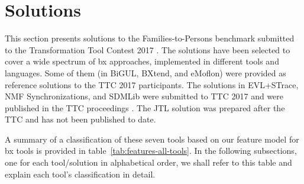 \section{Solutions}
\label{sec:Solutions}



This section presents solutions to the Families-to-Persons benchmark submitted to the Transformation Tool Contest 2017 \cite{Anjorin2017a}. The solutions have been selected to cover a wide spectrum of bx approaches, implemented in different tools and languages. Some of them (in BiGUL, BXtend, and eMoflon) were provided as reference solutions to the TTC 2017 participants. The solutions in EVL+STrace, NMF Synchronizations, and SDMLib were submitted to TTC 2017 and were published in the TTC proceedings \cite{Samimi-Dehkordi2017,Hinkel2017,Zundorf2017}. The JTL solution was prepared after the TTC and has not been published to date. 

A summary of a classification of these seven tools based on our feature model for bx tools is provided in table~\ref{tab:features-all-tools}.
In the following subsections, one for each tool/solution in alphabetical order, we shall refer to this table and explain each tool's classification in detail.

\renewcommand{\arraystretch}{1.2}

